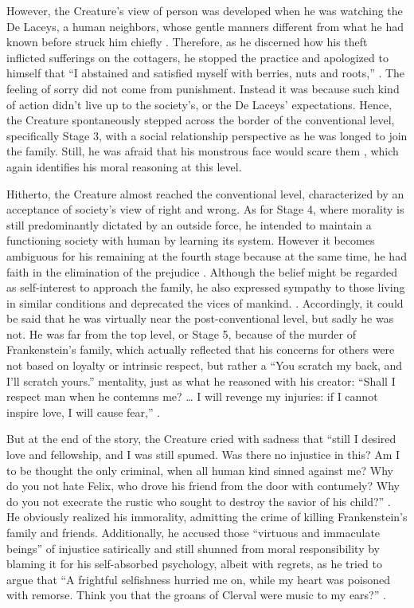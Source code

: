 \begin{text}
However, the Creature's view of person was developed when he was watching the De Laceys, a human neighbors, whose gentle manners different from what he had known before struck him chiefly . Therefore, as he discerned how his theft inflicted sufferings on the cottagers, he stopped the practice and apologized to himself that ``I abstained and satisfied myself with berries, nuts and roots,'' . The feeling of sorry did not come from punishment. Instead it was because such kind of action didn't live up to the society's, or the De Laceys' expectations. Hence, the Creature spontaneously stepped across the border of the conventional level, specifically Stage 3, with a social relationship perspective as he was longed to join the family. Still, he was afraid that his monstrous face would scare them , which again identifies his moral reasoning at this level.

Hitherto, the Creature almost reached the conventional level, characterized by an acceptance of society's view of right and wrong. As for Stage 4, where morality is still predominantly dictated by an outside force, he intended to maintain a functioning society with human by learning its system. However it becomes ambiguous for his remaining at the fourth stage because at the same time, he had faith in the elimination of the prejudice . Although the belief might be regarded as self-interest to approach the family, he also expressed sympathy to those living in similar conditions and deprecated the vices of mankind. . Accordingly, it could be said that he was virtually near the post-conventional level, but sadly he was not. He was far from the top level, or Stage 5, because of the murder of Frankenstein's family, which actually reflected that his concerns for others were not based on loyalty or intrinsic respect, but rather a ``You scratch my back, and I'll scratch yours.'' mentality, just as what he reasoned with his creator: ``Shall I respect man when he contemns me? \dots{} I will revenge my injuries: if I cannot inspire love, I will cause fear,'' .

But at the end of the story, the Creature cried with sadness that ``still I desired love and fellowship, and I was still spumed. Was there no injustice in this? Am I to be thought the only criminal, when all human kind sinned against me? Why do you not hate Felix, who drove his friend from the door with contumely? Why do you not execrate the rustic who sought to destroy the savior of his child?'' . He obviously realized his immorality, admitting the crime of killing Frankenstein's family and friends. Additionally, he accused those ``virtuous and immaculate beings'' of injustice satirically and still shunned from moral responsibility by blaming it for his self-absorbed psychology, albeit with regrets, as he tried to argue that ``A frightful selfishness hurried me on, while my heart was poisoned with remorse. Think you that the groans of Clerval were music to my ears?'' .


\end{text}
